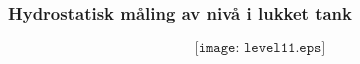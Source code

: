 \documentclass[aspectratio=169,xcolor=dvipsnames]{beamer}
\begin{document}
%
%
%
%
%
%
\begin{frame}
	\frametitle{Hydrostatisk måling av nivå i lukket tank}

	$$\texttt{[image: level11.eps]}$$
\end{frame}
%
\end{document}
